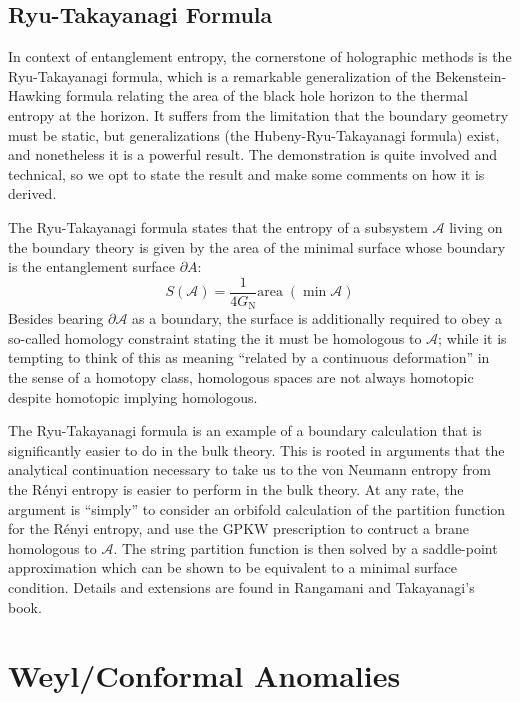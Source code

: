 \documentclass{report}
\begin{document}
\subsection{Ryu-Takayanagi Formula}
In context of entanglement entropy, the cornerstone of holographic methods is 
the Ryu-Takayanagi formula, which is a remarkable generalization of the
Bekenstein-Hawking formula relating the area of the black hole horizon to the
thermal entropy at the horizon. 
It suffers from the limitation that the boundary geometry must be static, but 
generalizations (the Hubeny-Ryu-Takayanagi formula) exist, and nonetheless 
it is a powerful result.  The demonstration is quite involved and technical, 
so we opt to state the result and make some comments on how it is derived.

The Ryu-Takayanagi formula states that the entropy of a subsystem $ \mathcal{A} $
living on the boundary theory is given by the area of the minimal surface whose 
boundary is the entanglement surface $ \partial  A $: 
\begin{equation*}
	S(\mathcal{A}) = \frac{1}{4G_{\text{N}}} \text{area}\;(\min \mathcal{A})
\end{equation*}
Besides bearing $ \partial \mathcal{A} $ as a boundary, the surface is additionally 
required to obey a so-called homology constraint stating the it must be homologous 
to $ \mathcal{A} $; while it is tempting to think of this as meaning ``related by a
continuous deformation'' in the sense of a homotopy class, homologous spaces 
are not always homotopic despite homotopic implying homologous. 

The Ryu-Takayanagi formula is an example of a boundary calculation that is
significantly easier to do in the bulk theory. This is rooted in arguments that 
the analytical continuation necessary to take us to the von Neumann entropy 
from the R\'enyi entropy is easier to perform in the bulk theory. At any rate, 
the argument is ``simply'' to consider an orbifold calculation of the partition 
function for the R\'enyi entropy, and use the GPKW prescription to contruct a
brane homologous to $ \mathcal{A} $. The string partition function is then 
solved by a saddle-point approximation which can be shown to be equivalent to 
a minimal surface condition. Details and extensions are found in Rangamani and 
Takayanagi's book.

\section{Weyl/Conformal Anomalies}
\end{document}
